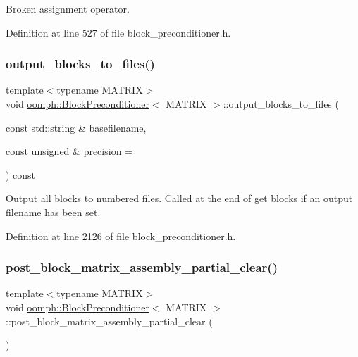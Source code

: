 Broken assignment operator. 



Definition at line 527 of file block\+\_\+preconditioner.\+h.

\mbox{\label{classoomph_1_1BlockPreconditioner_adec848504d36ebcd8e27ec60f52f75a6}} 
\subsubsection{\texorpdfstring{output\+\_\+blocks\+\_\+to\+\_\+files()}{output\_blocks\_to\_files()}}
{\footnotesize\ttfamily template$<$typename M\+A\+T\+R\+IX$>$ \\
void \hyperlink{classoomph_1_1BlockPreconditioner}{oomph\+::\+Block\+Preconditioner}$<$ M\+A\+T\+R\+IX $>$\+::output\+\_\+blocks\+\_\+to\+\_\+files (\begin{DoxyParamCaption}\item[{const std\+::string \&}]{basefilename,  }\item[{const unsigned \&}]{precision = {} }\end{DoxyParamCaption}) const\hspace{0.3cm}{\ttfamily [inline]}}

Output all blocks to numbered files. Called at the end of get blocks if an output filename has been set. 

Definition at line 2126 of file block\+\_\+preconditioner.\+h.

\mbox{\label{classoomph_1_1BlockPreconditioner_aa760ae71a5aae488547ccf721d412b1e}} 
\subsubsection{\texorpdfstring{post\+\_\+block\+\_\+matrix\+\_\+assembly\+\_\+partial\+\_\+clear()}{post\_block\_matrix\_assembly\_partial\_clear()}}
{\footnotesize\ttfamily template$<$typename M\+A\+T\+R\+IX$>$ \\
void \hyperlink{classoomph_1_1BlockPreconditioner}{oomph\+::\+Block\+Preconditioner}$<$ M\+A\+T\+R\+IX $>$\+::post\+\_\+block\+\_\+matrix\+\_\+assembly\+\_\+partial\+\_\+clear (\begin{DoxyParamCaption}{ }\end{DoxyParamCaption})\hspace{0.3cm}{\ttfamily [inline]}}



